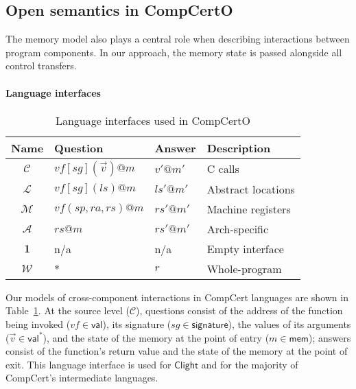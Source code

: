 \documentclass[draft,11pt]{report}
\newcommand{\kw}[1]{\ensuremath{ \mathsf{#1} }}
\newcommand{\figsize}{}
\begin{document}


\subsection{Open semantics in CompCertO} \label{sec:sem:open} %

The memory model also plays a central role
when describing interactions between program components.
In our approach, %
the memory state is passed %
alongside all control transfers.

\paragraph{Language interfaces} %

\begin{table} %
  \figsize
  \begin{tabular}{clll}
    \hline
    Name & Question & Answer & Description \\
    \hline
    $\mathcal{C}$ &
      $\mathit{vf}[\mathit{sg}](\vec{v})@m$ & $v'@m'$ &
      C calls \\
    $\mathcal{L}$ &
      $\mathit{vf}[\mathit{sg}](\mathit{ls})@m$ & $\mathit{ls}'@m'$ &
      Abstract locations \\
    $\mathcal{M}$ &
      $\mathit{vf}(\mathit{sp},\mathit{ra},\mathit{rs})@m$ & $\mathit{rs}'@m'$ &
      Machine registers \\
    $\mathcal{A}$ &
      $\mathit{rs}@m$ & $\mathit{rs}'@m'$ &
      Arch-specific \\
    $\mathbf{1}$ & n/a & n/a &
      Empty interface \\
    $\mathcal{W}$ & * & $r$ &
      Whole-program \\
    \hline
  \end{tabular}
  \caption{Language interfaces used in CompCertO}
  \label{tbl:li}
\end{table}

Our models of cross-component interactions in CompCert languages
are shown in Table~\ref{tbl:li}.
At the source level ($\mathcal{C}$),
questions consist of
the address of the function being invoked
($\mathit{vf} \in \kw{val}$),
its signature
($\mathit{sg} \in \kw{signature}$),
the values of its arguments
($\vec{v} \in \kw{val}^*$),
and the state of the memory at the point of entry
($m \in \kw{mem}$);
answers
consist of the function's return value
and the state of the memory at the point of exit.
This language interface is used for \kw{Clight} and
for the majority of CompCert's intermediate languages.
\end{document}
